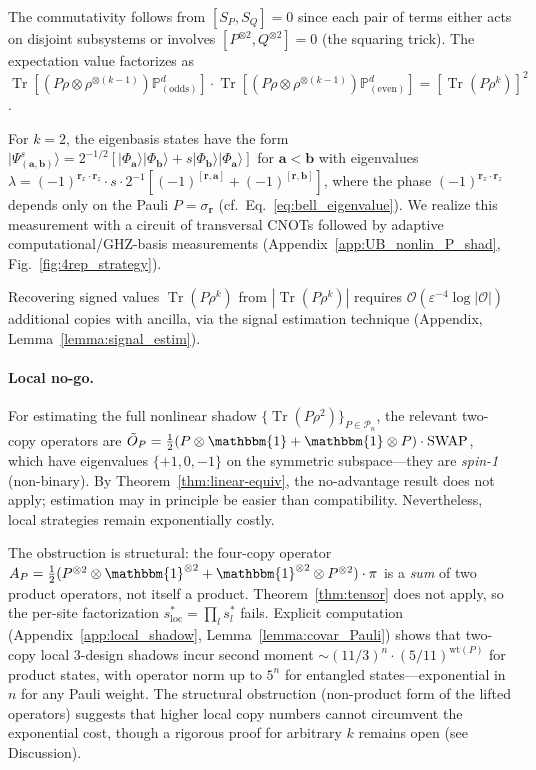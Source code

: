 \documentclass[aps,%
twocolumn,%
floatfix,%
pra,%
amsfonts,%
groupedaddress,%
superscriptaddress]{revtex4-2}%
\DeclareMathOperator{\tr}{Tr}
\newcommand{\ket}[1]{\lvert #1\rangle}
\newcommand{\ox}{\otimes}
\newcommand{\1}{\mathbbm{1}}
\newcommand*{\cO}{\mathcal{O}}
\newcommand*{\cP}{\mathcal{P}}
\newcommand*{\bP}{\mathbb{P}}
\newcommand\prlsubsection[1]{\paragraph*{#1\!\!\!\!}}
\begin{document}
The commutativity follows from $[S_P, S_Q] = 0$ since each pair of terms either acts on disjoint subsystems or involves $[P^{\ox 2}, Q^{\ox 2}] = 0$ (the squaring trick). The expectation value factorizes as $\tr[(P\rho\ox\rho^{\ox(k-1)})\bP^d_{(\mathrm{odds})}] \cdot \tr[(P\rho\ox\rho^{\ox(k-1)})\bP^d_{(\mathrm{even})}] = [\tr(P\rho^k)]^2$.

For $k=2$, the eigenbasis states have the form
$\ket{\Psi^s_{(\mathbf{a},\mathbf{b})}} = 2^{-1/2}[\ket{\Phi_\mathbf{a}}\ket{\Phi_\mathbf{b}} + s\ket{\Phi_\mathbf{b}}\ket{\Phi_\mathbf{a}}]$
for $\mathbf{a} < \mathbf{b}$ with eigenvalues $\lambda = (-1)^{\mathbf{r}_x\cdot\mathbf{r}_z}\cdot s\cdot 2^{-1}[(-1)^{[\mathbf{r},\mathbf{a}]} + (-1)^{[\mathbf{r},\mathbf{b}]}]$, where the phase $(-1)^{\mathbf{r}_x\cdot\mathbf{r}_z}$ depends only on the Pauli $P = \sigma_\mathbf{r}$ (cf.\ Eq.~\eqref{eq:bell_eigenvalue}). We realize this measurement with a circuit of transversal CNOTs followed by adaptive computational/GHZ-basis measurements (Appendix~\ref{app:UB_nonlin_P_shad}, Fig.~\ref{fig:4rep_strategy}).

Recovering signed values $\tr(P\rho^k)$ from $|\tr(P\rho^k)|$ requires $\mathcal{O}(\varepsilon^{-4}\log|\cO|)$ additional copies with ancilla, via the signal estimation technique (Appendix, Lemma~\ref{lemma:signal_estim}).

\prlsubsection{Local no-go.}\label{sec:local_nogo}
For estimating the full nonlinear shadow $\{\tr(P\rho^2)\}_{P\in\cP_n}$, the relevant two-copy operators are $\tilde{O}_P = \tfrac{1}{2}(P\ox\1 + \1\ox P)\cdot\mathrm{SWAP}$, which have eigenvalues $\{+1, 0, -1\}$ on the symmetric subspace---they are \emph{spin-1} (non-binary). By Theorem~\ref{thm:linear-equiv}, the no-advantage result does not apply; estimation may in principle be easier than compatibility. Nevertheless, local strategies remain exponentially costly.

The obstruction is structural: the four-copy operator $A_P = \tfrac{1}{2}(P^{\ox 2}\ox\1^{\ox 2} + \1^{\ox 2}\ox P^{\ox 2})\cdot\pi$ is a \emph{sum} of two product operators, not itself a product. Theorem~\ref{thm:tensor} does not apply, so the per-site factorization $s^*_{\mathrm{loc}} = \prod_l s^*_l$ fails. Explicit computation (Appendix~\ref{app:local_shadow}, Lemma~\ref{lemma:covar_Pauli}) shows that two-copy local 3-design shadows incur second moment $\sim (11/3)^n \cdot (5/11)^{\mathrm{wt}(P)}$ for product states, with operator norm up to $5^n$ for entangled states---exponential in $n$ for any Pauli weight. \color{red}The structural obstruction (non-product form of the lifted operators) suggests that higher local copy numbers cannot circumvent the exponential cost, though a rigorous proof for arbitrary $k$ remains open (see Discussion).\color{black}
\end{document}
